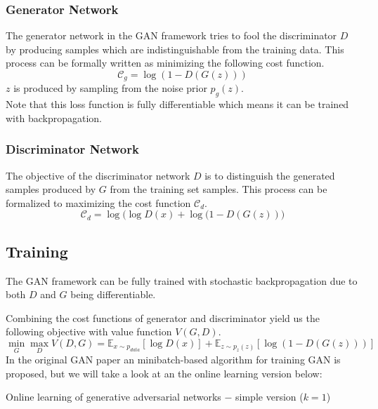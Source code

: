 \subsubsection{Generator Network}
The generator network in the GAN framework tries to fool the discriminator $D$ by producing samples which are indistinguishable from the training data.
This process can be formally written as minimizing the following cost function.
$$
\mathcal{C}_g = \log(1 - D(G(z)))
$$
$z$ is produced by sampling from the noise prior $p_g(z)$.\\

Note that this loss function is fully differentiable which means it can be trained with backpropagation.



\subsubsection{Discriminator Network}
The objective of the discriminator network $D$ is to distinguish the generated samples produced by $G$ from the training set samples.
This process can be formalized to maximizing the cost function $\mathcal{C}_d$.
$$
\mathcal{C}_d = \log\big(\log D(x) + \log (1 - D(G(z))\big)
$$



\subsection{Training}
\label{sub:gan_training}
The GAN framework can be fully trained with stochastic backpropagation due to both $D$ and $G$ being differentiable.

Combining the cost functions of generator and discriminator yield us the following objective with value function $V(G,D)$.
$$
\min_G \max_D V(D,G) = \mathbb{E}_{x \sim p_{data}}[\log D(x)] + \mathbb{E}_{z \sim p_z(z)}[\log(1 - D(G(z)))]
$$
In the original GAN paper an minibatch-based algorithm for training GAN is proposed, but we will take a look at an the online learning version below:\\
\begin{algorithm}
  \caption{Online learning of generative adversarial networks $-$ simple version ($k=1$)}
  \label{alg:gan_online}
  \begin{algorithmic}[1]
    \EndFor
  \end{algorithmic}
\end{algorithm}

